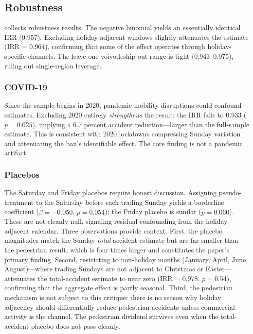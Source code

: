\documentclass[12pt]{article}
\begin{document}


\subsection{Robustness}

 collects robustness results. The negative binomial yields an essentially identical IRR (0.957). Excluding holiday-adjacent windows slightly attenuates the estimate (IRR = 0.964), confirming that some of the effect operates through holiday-specific channels. The leave-one-voivodeship-out range is tight (0.943--0.975), ruling out single-region leverage.

\subsubsection*{COVID-19} Since the sample begins in 2020, pandemic mobility disruptions could confound estimates. Excluding 2020 entirely \textit{strengthens} the result: the IRR falls to 0.933 ($p = 0.025$), implying a 6.7 percent accident reduction---larger than the full-sample estimate. This is consistent with 2020 lockdowns compressing Sunday variation and attenuating the ban's identifiable effect. The core finding is not a pandemic artifact.

\subsubsection*{Placebos} The Saturday and Friday placebos require honest discussion. Assigning pseudo-treatment to the Saturday before each trading Sunday yields a borderline coefficient ($\hat{\beta} = -0.050$, $p = 0.054$); the Friday placebo is similar ($p = 0.060$). These are not cleanly null, signaling residual confounding from the holiday-adjacent calendar. Three observations provide context. First, the placebo magnitudes match the Sunday \textit{total}-accident estimate but are far smaller than the pedestrian result, which is four times larger and constitutes the paper's primary finding. Second, restricting to non-holiday months (January, April, June, August)---where trading Sundays are not adjacent to Christmas or Easter---attenuates the total-accident estimate to near zero (IRR = 0.978, $p = 0.54$), confirming that the aggregate effect is partly seasonal. Third, the pedestrian mechanism is not subject to this critique: there is no reason why holiday adjacency should differentially reduce pedestrian accidents unless commercial activity is the channel. The pedestrian dividend survives even when the total-accident placebo does not pass cleanly.
\end{document}
